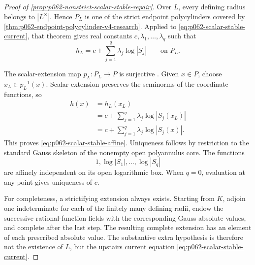 \begin{proof}[Proof of
\cref{prop:p062-nonstrict-scalar-stable-repair}]
Over \(L\), every defining radius belongs to \(|L^\times|\).  Hence
\(P_L\) is one of the strict endpoint polycylinders covered by
\cref{thm:p062-endpoint-polycylinder-v4-research}.  Applied to
\eqref{eq:p062-scalar-stable-current}, that theorem gives real constants
\(c,\lambda_1,\ldots,\lambda_q\) such that
\begin{equation}\label{eq:p062-scalar-stable-upstairs-formula}
          h_L=c+\sum_{j=1}^q\lambda_j\log|S_j|
          \qquad\text{on }P_L.
\end{equation}

The scalar-extension map \(p_L:P_L\to P\) is surjective
\cite[\S11.1.9]{CLD25}.  Given \(x\in P\), choose
\(x_L\in p_L^{-1}(x)\).  Scalar extension preserves the seminorms of the
coordinate functions, so
\[
 \begin{aligned}
 h(x)
   &=h_L(x_L)\\
   &=c+\sum_{j=1}^q\lambda_j\log|S_j(x_L)|\\
   &=c+\sum_{j=1}^q\lambda_j\log|S_j(x)|.
 \end{aligned}
\]
This proves \eqref{eq:p062-scalar-stable-affine}.  Uniqueness follows by
restriction to the standard Gauss skeleton of the nonempty open
polyannulus core.  The functions
\[
                  1,\log|S_1|,\ldots,\log|S_q|
\]
are affinely independent on its open logarithmic box.  When \(q=0\),
evaluation at any point gives uniqueness of \(c\).

For completeness, a strictifying extension always exists.  Starting from
\(K\), adjoin one indeterminate for each of the finitely many defining
radii, endow the successive rational-function fields with the corresponding
Gauss absolute values, and complete after the last step.  The resulting
complete extension has an element of each prescribed absolute value.  The
substantive extra hypothesis is therefore not the existence of \(L\), but
the upstairs current equation
\eqref{eq:p062-scalar-stable-current}.
\end{proof}
